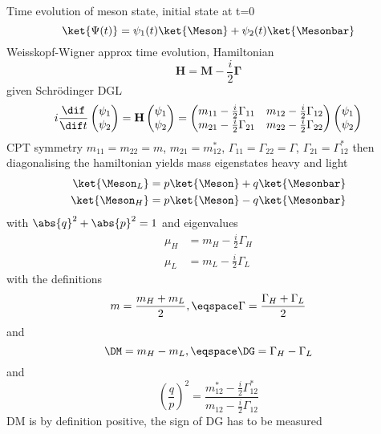 Time evolution of meson state, initial state at t=0
%
\begin{equation}
  \ket{\Psi(t)} = \psi_1(t) \ket{\Meson} + \psi_2(t) \ket{\Mesonbar}
\end{equation}
%
Weisskopf-Wigner approx time evolution, Hamiltonian
%
\begin{equation}
  \mathbf{H} = \mathbf{M} - \frac{i}{2} \mathbf{\Gamma}
\end{equation}
%
given Schrödinger DGL
%
\begin{equation}
  i \frac{\dif}{\dif t} 
  \begin{pmatrix}
    \psi_1 \\
    \psi_2
  \end{pmatrix}
  =
  \mathbf{H}
  \begin{pmatrix}
    \psi_1 \\
    \psi_2
  \end{pmatrix}
  =
  \begin{pmatrix}
    m_{11} - \frac{i}{2} \Gamma_{11}    & m_{12} - \frac{i}{2} \Gamma_{12} \\
    m_{21} - \frac{i}{2} \Gamma_{21}    & m_{22} - \frac{i}{2} \Gamma_{22} \\
  \end{pmatrix}
  \begin{pmatrix}
    \psi_1 \\
    \psi_2
  \end{pmatrix}
\end{equation}
%
CPT symmetry $m_{11} = m_{22} = m$, $m_{21} = m_{12}^{\ast}$, $\Gamma_{11} = \Gamma_{22} = \Gamma$, $\Gamma_{21} = \Gamma_{12}^{\ast}$
%
then diagonalising the hamiltonian yields mass eigenstates heavy and light
%
\begin{equation}
  \begin{split}
    \ket{\Meson_L} &= p \ket{\Meson} + q \ket{\Mesonbar} \\
    \ket{\Meson_H} &= p \ket{\Meson} - q \ket{\Mesonbar}
  \end{split}
\end{equation}
%
with $\abs{q}^2 + \abs{p}^2 = 1$ and eigenvalues
%
\begin{equation}
  \begin{split}
    \mu_H &= m_H - \frac{i}{2} \Gamma_H \\
    \mu_L &= m_L - \frac{i}{2} \Gamma_L
  \end{split}
\end{equation}
%
with the definitions 
%
\begin{equation}
  m = \frac{m_H + m_L}{2}, \eqspace \Gamma = \frac{\Gamma_H + \Gamma_L}{2}
\end{equation}
%
and
%
\begin{equation}
  \DM = m_H - m_L, \eqspace \DG = \Gamma_H - \Gamma_L
\end{equation}
%
and
%
\begin{equation}
  \left(\frac{q}{p}\right)^2 = \frac{m_{12}^{\ast} - \frac{i}{2} \Gamma_{12}^{\ast}}{m_{12} - \frac{i}{2} \Gamma_{12}}
\end{equation}
%
DM is by definition positive, the sign of DG has to be measured

